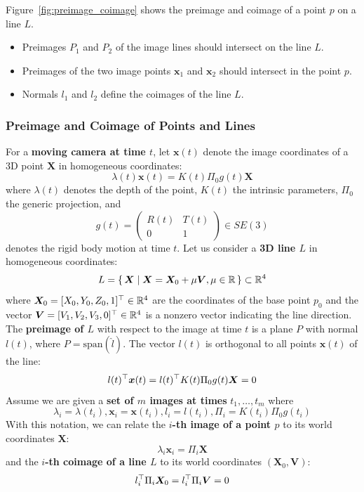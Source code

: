 Figure~\ref{fig:preimage_coimage} shows the preimage and coimage of a point $p$
on a line $L$.
\begin{itemize}
	\item Preimages $P_1$ and $P_2$ of the image lines should intersect on the line $L$.
	\item Preimages of the two image points $\bm{x}_1$ and $\bm{x}_2$
		should intersect in the point $p$.
	\item Normals $l_1$ and $l_2$ define the coimages of the line $L$.
\end{itemize}


\subsubsection*{Preimage and Coimage of Points and Lines}%
\label{ssub:preimage_and_coimage_of_points_and_lines}

For a \textbf{moving camera at time $t$}, let $\bm{x}(t)$ denote the image coordinates
of a 3D point $\bm{X}$ in homogeneous coordinates:
\[
	\lambda(t) \bm{x}(t) = K(t) \Pi_0 g(t) \bm{X}
\]
where $\lambda(t)$ denotes the depth of the point, $K(t)$ the intrinsic parameters,
$\Pi_0$ the generic projection, and
\[
	g(t) = \begin{pmatrix}
		R(t) & T(t) \\
		0 & 1
	\end{pmatrix}
	\in SE(3)
\]
denotes the rigid body motion at time $t$.
Let us consider a \textbf{3D line $L$} in homogeneous coordinates:
\[
	L = \{\, \bm{X} \mid{} \bm{X} = \bm{X}_0 + \mu \bm{V}, \mu \in \mathbb{R} \,\} \subset \mathbb{R}^4
\]
where $\bm{X}_0 = [ X_0, Y_0, Z_0, 1 ]^{\top} \in \mathbb{R}^4$ are the coordinates
of the base point $p_0$ and the vector $\bm{V} = [V_1, V_2, V_3, 0]^{\top} \in \mathbb{R}^4$
is a nonzero vector indicating the line direction.\\

The \textbf{preimage of $L$} with respect to the image at time $t$ is a plane $P$
with normal $l(t)$, where $P = \text{span}(\widehat{l})$.
The vector $l(t)$ is orthogonal to all points $\bm{x}(t)$ of the line:
\[
	l(t)^{\top} \bm{x}(t) = l(t)^{\top} K(t) \Pi_0 g(t) \bm{X} = 0
\]
Assume we are given a \textbf{set of $m$ images at times} $t_1, \ldots, t_m$
where
\[
	\lambda_i = \lambda(t_i),
	\bm{x}_i = \bm{x}(t_i),
	l_i = l(t_i),
	\Pi_i = K(t_i) \Pi_0 g(t_i)
\]
With this notation, we can relate the \textbf{$i$-th image of a point $p$}
to its world coordinates $\bm{X}$:
\[
	\lambda_i \bm{x}_i = \Pi_i \bm{X}
\]
and the \textbf{$i$-th coimage of a line $L$}
to its world coordinates $(\bm{X}_0, \bm{V})$:
\[
	l_i^{\top} \Pi_i \bm{X}_0 = l_i^{\top} \Pi_i \bm{V} = 0
\]



